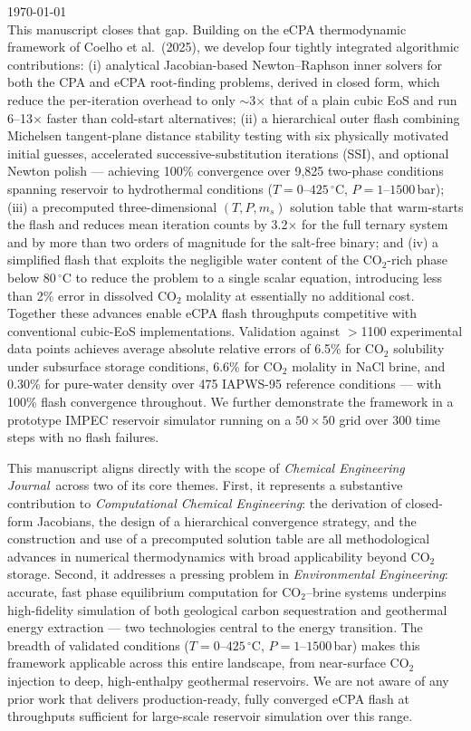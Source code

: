 \documentclass[11pt, a4paper]{letter}
\newcommand{\whichjob}{\textit{Chemical Engineering Journal}~}
\begin{document}
\begin{letter}{
    \smallskip\today\\\smallskip
}
This manuscript closes that gap. Building on the eCPA thermodynamic framework of Coelho et al.\ (2025), we develop four tightly integrated algorithmic contributions: (i) analytical Jacobian-based Newton--Raphson inner solvers for both the CPA and eCPA root-finding problems, derived in closed form, which reduce the per-iteration overhead to only $\sim$3$\times$ that of a plain cubic EoS and run 6--13$\times$ faster than cold-start alternatives; (ii) a hierarchical outer flash combining Michelsen tangent-plane distance stability testing with six physically motivated initial guesses, accelerated successive-substitution iterations (SSI), and optional Newton polish --- achieving 100\% convergence over 9{,}825 two-phase conditions spanning reservoir to hydrothermal conditions ($T = 0$--$425\,^\circ$C, $P = 1$--$1500$\,bar); (iii) a precomputed three-dimensional $(T, P, m_s)$ solution table that warm-starts the flash and reduces mean iteration counts by 3.2$\times$ for the full ternary system and by more than two orders of magnitude for the salt-free binary; and (iv) a simplified flash that exploits the negligible water content of the CO$_2$-rich phase below $80\,^\circ$C to reduce the problem to a single scalar equation, introducing less than 2\% error in dissolved CO$_2$ molality at essentially no additional cost. Together these advances enable eCPA flash throughputs competitive with conventional cubic-EoS implementations. Validation against $>$1100 experimental data points achieves average absolute relative errors of 6.5\% for CO$_2$ solubility under subsurface storage conditions, 6.6\% for CO$_2$ molality in NaCl brine, and 0.30\% for pure-water density over 475 IAPWS-95 reference conditions --- with 100\% flash convergence throughout. We further demonstrate the framework in a prototype IMPEC reservoir simulator running on a $50\times50$ grid over 300 time steps with no flash failures.

This manuscript aligns directly with the scope of \whichjob across two of its core themes. First, it represents a substantive contribution to \textit{Computational Chemical Engineering}: the derivation of closed-form Jacobians, the design of a hierarchical convergence strategy, and the construction and use of a precomputed solution table are all methodological advances in numerical thermodynamics with broad applicability beyond CO$_2$ storage. Second, it addresses a pressing problem in \textit{Environmental Engineering}: accurate, fast phase equilibrium computation for CO$_2$--brine systems underpins high-fidelity simulation of both geological carbon sequestration and geothermal energy extraction --- two technologies central to the energy transition. The breadth of validated conditions ($T = 0$--$425\,^\circ$C, $P = 1$--$1500$\,bar) makes this framework applicable across this entire landscape, from near-surface CO$_2$ injection to deep, high-enthalpy geothermal reservoirs. We are not aware of any prior work that delivers production-ready, fully converged eCPA flash at throughputs sufficient for large-scale reservoir simulation over this range.


\end{letter}
\end{document}
